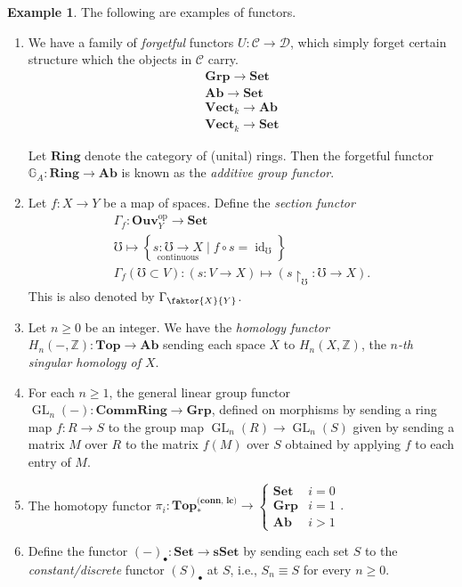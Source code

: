 \documentclass[10pt,letterpaper,cm]{nupset}
\theoremstyle{definition}
\newtheorem{exmp}[definition]{Example}
\theoremstyle{theorem}
\theoremstyle{remark}
\newcommand{\G}{\mathbb G}
\newcommand{\Z}{\mathbb Z}
\newcommand{\1}{\mathbf{1}}
\renewcommand{\c}{\mathscr{C}}
\renewcommand{\d}{\mathscr{D}}
\newcommand{\0}{\vec 0}
\DeclareMathOperator*{\GL}{GL}
\DeclareMathOperator{\id}{\mathrm{id}}
\DeclareMathOperator{\op}{op}
\begin{document}
\begin{exmp}  The following are examples of functors.
\begin{enumerate}
\item We have a family of \textit{forgetful} functors $U : \c \to \d$, which simply forget certain structure which the objects in $\c$ carry.
\begin{gather*}
\mathbf{Grp} \to \mathbf{Set}
\\ \mathbf{Ab} \to \mathbf{Set}
\\ \mathbf{Vect}_k \to \mathbf{Ab}
\\ \mathbf{Vect}_k \to \mathbf{Set}
\end{gather*} 

Let $\mathbf{Ring}$ denote the category of (unital) rings. Then the forgetful functor $\G_A: \mathbf{Ring} \to \mathbf{Ab}$ is known as the \textit{additive group functor}.
\item Let $f: X \to Y$ be a map of spaces. Define the \textit{section functor}
 \begin{gather*}
 \Gamma_f: \mathbf{Ouv}_Y^{\op} \to \mathbf{Set}
 \\
\mho \mapsto \left\{\underset{\text{continuous}}{s: \mho \to X} \mid f \circ s = \id_{\mho}\right\}
\\ \Gamma_f(\mho \subset V) : \left(s: V \to X\right) \mapsto \left(s\restriction_{\mho} : \mho \to X\right).
\end{gather*} This is also denoted by $\Gamma_{\faktor{X}{Y}}$.
\item Let $n\geq 0$ be an integer. We have the \textit{homology functor} $H_n(-, \Z) : \mathbf{Top} \to \mathbf{Ab}$ sending each space $X$ to $H_n(X, \Z)$, the \textit{$n$-th singular homology of $X$}.
\item For each $n\geq 1$, the general linear group functor $\GL_n(-) : \mathbf{CommRing} \to \mathbf{Grp}$, defined on morphisms by sending a ring map $f: R \to S$ to the group map $\GL_n(R) \to \GL_n(S)$ given by sending a matrix $M$ over $R$ to the matrix $f(M)$ over $S$ obtained by applying $f$ to each entry of $M$.
\item The homotopy functor $\pi_i : \mathbf{Top_{\ast}^{\text{(conn, lc)}}} \to
 \begin{cases} 
\mathbf{Set} & i=0
\\ \mathbf{Grp} & i = 1 \\
\mathbf{Ab} & i >1
\end{cases}.$
\item Define the functor  $\left({-}\right)_{\bullet} : \mathbf{Set} \to {\mathbf{sSet}}$ by sending each set $S$ to the \textit{constant/discrete} functor $\left(S\right)_{\bullet}$ at $S$, i.e.,  $S_n \equiv S$ for every $n\geq 0$.


\end{enumerate}
\end{exmp}
\end{document}
